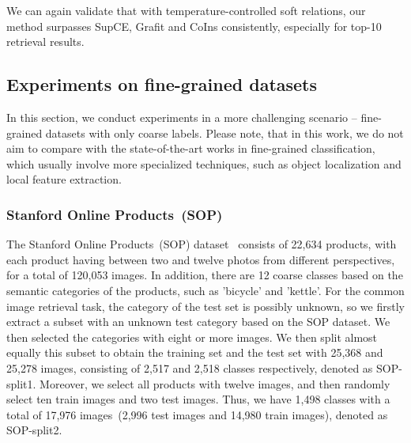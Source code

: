 \documentclass[10pt,twocolumn,letterpaper]{article}
\begin{document}
We can again validate that with temperature-controlled soft relations, our method surpasses SupCE, Grafit and CoIns consistently, especially for top-10 retrieval results.

\subsection{Experiments on fine-grained datasets}\label{exp:fine-grained}
In this section, we conduct experiments in a more challenging scenario -- fine-grained datasets with only coarse labels. Please note, that in this work, we do not aim to compare with the state-of-the-art works in fine-grained classification, which usually involve more specialized techniques, such as object localization and local feature extraction.

\subsubsection{Stanford Online Products~(SOP)}
The Stanford Online Products~(SOP) dataset~\cite{sopdataset} consists of 22,634 products, with each product having between two and twelve photos from different perspectives, for a total of 120,053 images. In addition, there are 12 coarse classes based on the semantic categories of the products, such as 'bicycle' and 'kettle'. For the common image retrieval task, the category of the test set is possibly unknown, so we firstly extract a subset with an unknown test category based on the SOP dataset. We then selected the categories with eight or more images. We then split almost equally this subset to obtain the training set and the test set with 25,368 and 25,278 images, consisting of 2,517 and 2,518 classes respectively, denoted as SOP-split1. Moreover, we select all products with twelve images, and then randomly select ten train images and two test images. Thus, we have 1,498 classes with a total of 17,976 images~(2,996 test images and 14,980 train images), denoted as SOP-split2. 
\end{document}
